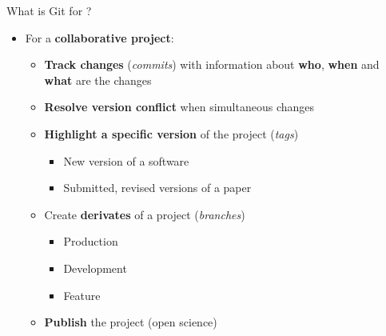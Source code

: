 \documentclass[10pt]{beamer}
\begin{document}
\begin{frame}{What is Git for ?}
\protect\hypertarget{what-is-git-for-1}{}
\begin{itemize}
\item
  For a \textbf{collaborative project}:
  \begin{itemize}
  \item
    \textbf{Track changes} (\emph{commits}) with information about
    \textbf{who}, \textbf{when} and \textbf{what} are the changes
  \item
    \textbf{Resolve version conflict} when simultaneous changes
 \item
    \textbf{Highlight a specific version} of the project (\emph{tags})
    \begin{itemize}
    \item
      New version of a software
    \item
      Submitted, revised versions of a paper
    \end{itemize}
    \item 
        Create \textbf{derivates} of a project (\emph{branches})
        \begin{itemize}
            \item Production
            \item Development
            \item Feature
        \end{itemize}
  \item
    \textbf{Publish} the project (open science)
  \end{itemize}
\end{itemize}
\end{frame}
\end{document}
